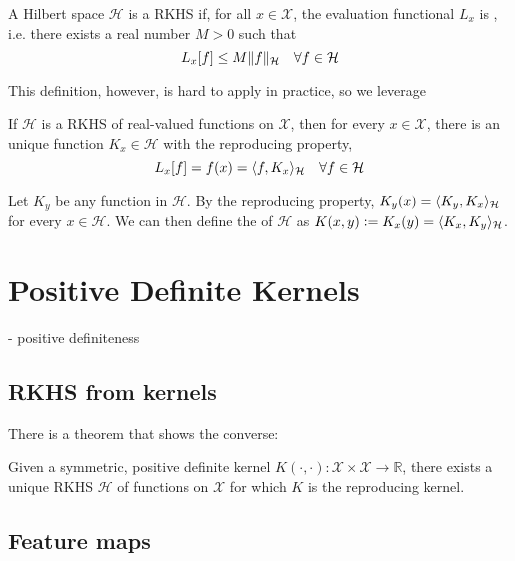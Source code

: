 \begin{definition}
A Hilbert space $\mathcal{H}$ is a RKHS if, for all $x \in \mathcal{X}$, the evaluation functional $L_x$ is , i.e. there exists a real number $M > 0$ such that 
\begin{equation}
  L_x[f] \leq M \lVert f\rVert_\mathcal{H} \quad \forall f \in \mathcal{H}
\end{equation}
\end{definition}

This definition, however, is hard to apply in practice, so we leverage 

\begin{theorem}
If $\mathcal{H}$ is a RKHS of real-valued functions on $\mathcal{X}$, then for every $x \in \mathcal{X}$, there is an unique function $K_x \in \mathcal{H}$ with the reproducing property,
\begin{equation}
  L_x[f] = f(x) = \langle f, K_x\rangle_\mathcal{H} \quad \forall f \in \mathcal{H}
\end{equation}
\end{theorem}

Let $K_y$ be any function in $\mathcal{H}$. By the reproducing property, $K_y(x) = \langle K_y, K_x\rangle_\mathcal{H}$ for every $x \in \mathcal{H}$. We can then define the  of $\mathcal{H}$ as $K(x, y) \vcentcolon= K_x(y) = \langle K_x, K_y\rangle_\mathcal{H}$.


\section{Positive Definite Kernels}

- positive definiteness

\subsection{RKHS from kernels}
There is a theorem that shows the converse:

\begin{theorem}
Given a symmetric, positive definite kernel $K(\cdot, \cdot) : \mathcal{X} \times \mathcal{X} \to \mathbb{R}$, there exists a unique RKHS $\mathcal{H}$ of functions on $\mathcal{X}$ for which $K$ is the reproducing kernel.
\end{theorem}


\subsection{Feature maps}

